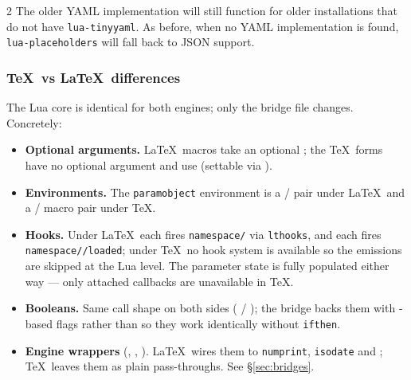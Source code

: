 \documentclass{ltxdoc}
\begin{document}
\begin{multicols}{2}
        The older YAML implementation will still function for older installations that do not have \texttt{lua-tinyyaml}.
        As before, when no YAML implementation is found, \texttt{lua-placeholders} will fall back to JSON support.

        \subsubsection{\TeX\ vs \LaTeX\ differences}\label{sec:engine-diff}
        The Lua core is identical for both engines; only the bridge file changes.
        Concretely:
        \begin{itemize}[align=left,leftmargin=*]
            \item \textbf{Optional arguments.}\hspace*{0.5em}
                  \LaTeX\ macros take an optional ; the \TeX\ forms have no optional argument and use \cmd{\curnamespace} (settable via \cmd{\setnamespace}).
            \item \textbf{Environments.}\hspace*{0.5em}
                  The \texttt{paramobject} environment is a \cmd{\begin}/\cmd{\end} pair under \LaTeX\ and a \cmd{\paramobject}/\cmd{\endparamobject} macro pair under \TeX.
            \item \textbf{Hooks.}\hspace*{0.5em}
                  Under \LaTeX\ each \cmd{\loadrecipe} fires \texttt{namespace/} via \texttt{lthooks}, and each \cmd{\loadpayload} fires \texttt{namespace/}\texttt{/loaded}; under \TeX\ no hook system is available so the emissions are skipped at the Lua level.
                  The parameter state is fully populated either way --- only attached callbacks are unavailable in \TeX.
            \item \textbf{Booleans.}\hspace*{0.5em}
                  Same call shape on both sides (\cmd{\paramnewbool} / \cmd{\paramsetbool}); the bridge backs them with \cmd{\let}-based flags rather than \cmd{\newif} so they work identically without \texttt{ifthen}.
            \item \textbf{Engine wrappers} (\cmd{\paramnumberformat}, \cmd{\paramdateformat}, \cmd{\paramfieldterm}).\hspace*{0.5em}
                  \LaTeX\ wires them to \texttt{numprint}, \texttt{isodate} and \cmd{\xspace}; \TeX\ leaves them as plain pass-throughs.
                  See \S\ref{sec:bridges}.
        \end{itemize}
    \end{multicols}
\end{document}
